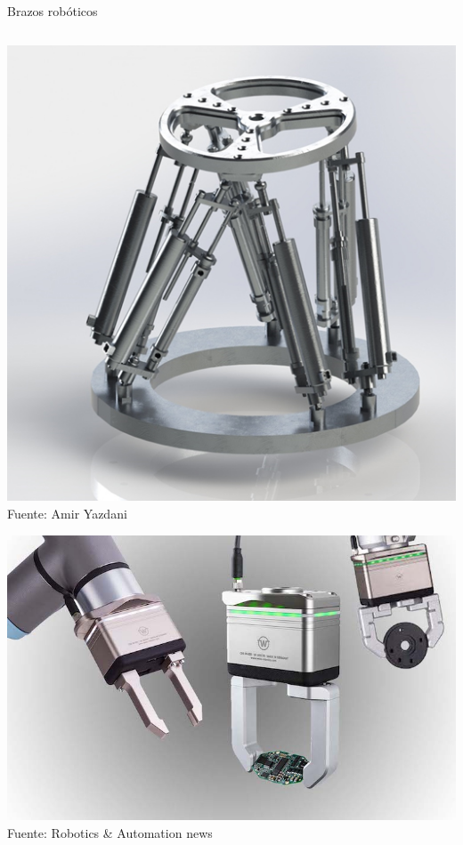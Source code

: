\documentclass[presentation,aspectratio=169]{beamer}
\begin{document}
\begin{frame}[label={sec:org0d4980f}]{Brazos robóticos}
\begin{columns}
\begin{column}{0.5\columnwidth}
\begin{center}
 \includegraphics[width=.5\linewidth]{../figures/stewart.jpg}\\
 \tiny Fuente: Amir Yazdani

\end{center}
\pause

\begin{center}
 \includegraphics[width=.7\linewidth]{../figures/gripper.jpg}\\
 \tiny Fuente: Robotics \& Automation news
\end{center}
\end{column}
\end{columns}
\end{frame}
\end{document}
